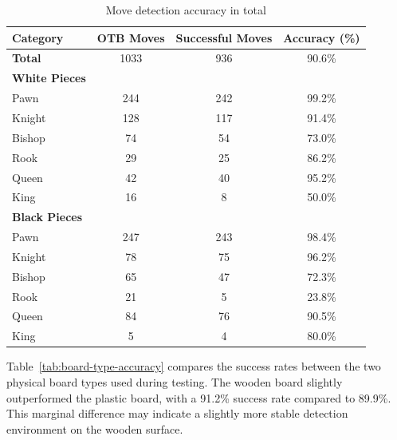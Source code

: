 \begin{table}[htbp]
\centering
\caption{Move detection accuracy in total}
\label{tab:accuracy-total}
\begin{tabular}{lccc}
\toprule
\textbf{Category} & \textbf{OTB Moves} & \textbf{Successful Moves} & \textbf{Accuracy (\%)} \\
\midrule
\textbf{Total} & 1033 & 936 & 90.6\% \\
\midrule
\textbf{White Pieces} & & & \\
\hspace{1em}Pawn  & 244 & 242 & 99.2\% \\
\hspace{1em}Knight & 128 & 117 & 91.4\% \\
\hspace{1em}Bishop & 74  & 54  & 73.0\% \\
\hspace{1em}Rook   & 29  & 25  & 86.2\% \\
\hspace{1em}Queen  & 42  & 40  & 95.2\% \\
\hspace{1em}King   & 16  & 8   & 50.0\% \\
\midrule
\textbf{Black Pieces} & & & \\
\hspace{1em}Pawn  & 247 & 243 & 98.4\% \\
\hspace{1em}Knight & 78  & 75  & 96.2\% \\
\hspace{1em}Bishop & 65  & 47  & 72.3\% \\
\hspace{1em}Rook   & 21  & 5   & 23.8\% \\
\hspace{1em}Queen  & 84  & 76  & 90.5\% \\
\hspace{1em}King   & 5   & 4   & 80.0\% \\
\bottomrule
\end{tabular}
\end{table}

Table~\ref{tab:board-type-accuracy} compares the success rates between the two physical board types used during testing. The wooden board slightly outperformed the plastic board, with a 91.2\% success rate compared to 89.9\%. This marginal difference may indicate a slightly more stable detection environment on the wooden surface. \\


